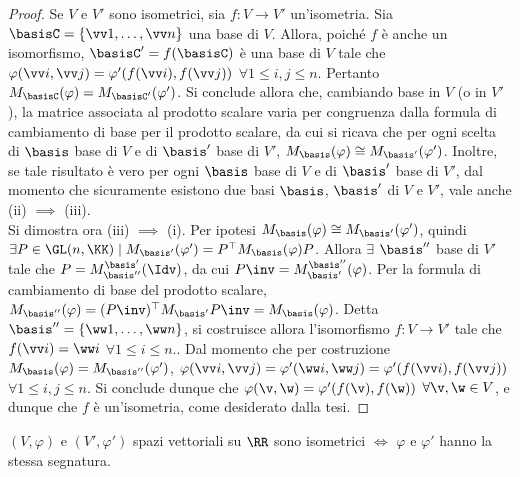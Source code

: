 \documentclass[11pt]{article}
\begin{document}
	\begin{proof} Se $V$ e $V'$ sono isometrici, sia $f : V \to V'$ un'isometria. Sia $\basisC = \{ \vv 1, \ldots, \vv n \}$ una base di $V$. Allora, poiché $f$ è anche un isomorfismo, $\basisC' = f(\basisC)$ è una base di $V$ tale che
		$\varphi(\vv i, \vv j) = \varphi'(f(\vv i), f(\vv j))$ $\forall 1 \leq i, j \leq n$. Pertanto $M_\basisC(\varphi) = M_{\basisC'}(\varphi')$. Si conclude allora che, cambiando base in $V$ (o in $V'$), la matrice associata
		al prodotto scalare varia per congruenza dalla formula di cambiamento di base per il prodotto scalare, da cui si ricava che per ogni scelta di $\basis$ base di $V$ e di $\basis'$ base di $V'$, $M_\basis(\varphi) \cong M_{\basis'}(\varphi')$. Inoltre, se tale risultato è vero per ogni $\basis$ base di $V$ e di $\basis'$ base di $V'$, dal momento che sicuramente esistono due basi $\basis$, $\basis'$ di $V$ e $V'$, vale anche (ii) $\implies$ (iii). \\
		
		Si dimostra ora (iii) $\implies$ (i). Per ipotesi $M_\basis(\varphi) \cong M_{\basis'}(\varphi')$, quindi
		$\exists P \in \GL(n, \KK) \mid M_{\basis'}(\varphi') = P^\top M_\basis(\varphi) P$. Allora $\exists$ $\basis''$
		base di $V'$ tale che $P = M_{\basis''}^{\basis'}(\Idv)$, da cui $P\inv = M_{\basis'}^{\basis''}(\varphi)$. Per la formula di cambiamento di base del prodotto
		scalare, $M_{\basis''}(\varphi) = (P\inv)^\top M_{\basis'} P\inv = M_\basis(\varphi)$. Detta
		$\basis'' = \{ \ww 1, \ldots, \ww n \}$, si costruisce allora l'isomorfismo $f : V \to V'$ tale
		che $f(\vv i) = \ww i$ $\forall 1 \leq i \leq n$.. Dal momento che per costruzione $M_\basis(\varphi) = M_{\basis''}(\varphi')$,
		$\varphi(\vv i, \vv j) = \varphi'(\ww i, \ww j) = \varphi'(f(\vv i), f(\vv j))$ $\forall 1 \leq i, j \leq n$.
		Si conclude dunque che $\varphi(\v, \w) = \varphi'(f(\v), f(\w))$ $\forall \v, \w \in V$, e dunque
		che $f$ è un'isometria, come desiderato dalla tesi. 
	\end{proof}

	\begin{proposition} $(V, \varphi)$ e $(V', \varphi')$ spazi vettoriali
		su $\RR$ sono
		isometrici $\iff$ $\varphi$ e $\varphi'$ hanno la stessa segnatura.
	\end{proposition}
\end{document}
